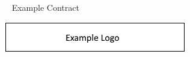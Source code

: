 {
    \hypersetup{hidelinks}
	\
	\vfil
	\hfil Example Contract \hfil
	\vfil
    \parbox[b][0.625in][t]{6.5in}{
        \vspace{-0.375in}
        \parbox[b][0.625in][t]{3.74in}{
            \href{http://my.web.site}
            {\includegraphics{ExampleLogo.png}}
        }
        \hfill
    }
	\pagebreak
}



